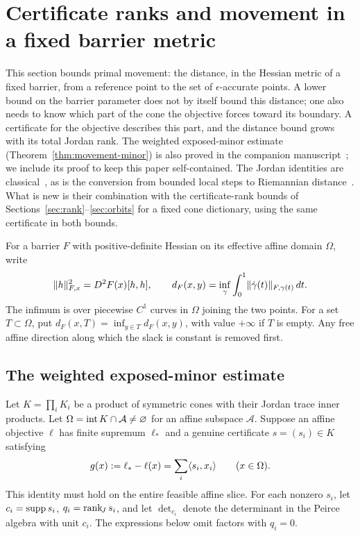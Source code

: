 \section{Certificate ranks and movement in a fixed barrier metric}
\label{sec:exposed-movement}
This section bounds primal movement: the distance, in the Hessian
metric of a fixed barrier, from a reference point to the set of
$\epsilon$-accurate points. A lower bound on the barrier parameter
does not by itself bound this distance; one also needs to know which
part of the cone the objective forces toward its boundary. A certificate
for the objective describes this part, and the distance bound grows with
its total Jordan rank. The weighted exposed-minor estimate
(Theorem~\ref{thm:movement-minor}) is also proved in the companion
manuscript~\cite{CentralPathCompanion}; we include its proof to keep
this paper self-contained. The Jordan identities are
classical~\cite{FK1994}, as is the conversion from bounded local steps
to Riemannian distance~\cite{NT2002}. What is new is their combination
with the certificate-rank bounds of
Sections~\ref{sec:rank}--\ref{sec:orbits} for a fixed cone dictionary,
using the same certificate in both bounds.

For a barrier $F$ with positive-definite Hessian on its effective affine
domain $\Omega$, write
\[
 \lVert h\rVert_{F,x}^2=D^2F(x)[h,h],\qquad
 d_F(x,y)=\inf_\gamma\int_0^1\lVert \dot\gamma(t)\rVert_{F,\gamma(t)}\,dt.
\]
The infimum is over piecewise $C^1$ curves in $\Omega$ joining the two
points. For a set $T\subset\Omega$, put $d_F(x,T)=\inf_{y\in T}d_F(x,y)$,
with value $+\infty$ if $T$ is empty. Any free affine direction
along which the slack is constant is removed first.

\subsection{The weighted exposed-minor estimate}
Let $K=\prod_iK_i$ be a product of symmetric cones with their Jordan
trace inner products. Let $\Omega=\operatorname{int} K\cap\mathcal A\ne\varnothing$
for an affine subspace $\mathcal A$. Suppose an affine objective $\ell$
has finite supremum $\ell_*$ and a genuine certificate $s=(s_i)\in K$
satisfying
\begin{equation}\label{eq:movement-certificate}
 g(x):=\ell_*-\ell(x)=\sum_i\langle s_i,x_i\rangle\qquad(x\in\Omega).
\end{equation}
This identity must hold on the entire feasible affine slice. For each
nonzero $s_i$, let $c_i=\operatorname{supp} s_i$, $q_i=\operatorname{rank}_{\!J} s_i$, and let
$\det_{c_i}$ denote the determinant in the Peirce algebra with unit $c_i$.
The expressions below omit factors with $q_i=0$.

